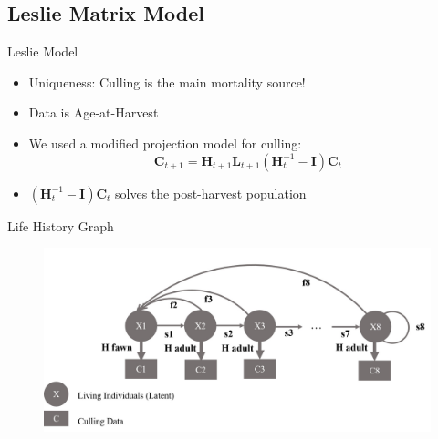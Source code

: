 \documentclass{beamer}
\begin{document}
\subsection{Leslie Matrix Model}
\begin{frame}{Leslie Model}
	\begin{itemize}
		\item Uniqueness: Culling is the main mortality source!
		\item Data is Age-at-Harvest
		\item We used a modified projection model for culling:
		\begin{equation}
			\mathbf{C}_{t+1}=\mathbf{H}_{t+1}\mathbf{L}_{t+1}(\mathbf{H}_{t}^{-1}-\mathbf{I})\mathbf{C}_{t}
		\end{equation}
		\item $(\mathbf{H}_{t}^{-1}-\mathbf{I})\mathbf{C}_{t}$ solves the post-harvest population
	\end{itemize}
\end{frame}

\begin{frame}{Life History Graph}
	\begin{figure}[ht]
		\centering
		\includegraphics[scale=.18]{fig/Chicago_deer/LHD.jpg}
		\label{LHD}
	\end{figure}
\end{frame}
\end{document}
